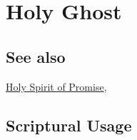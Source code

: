 \section{Holy Ghost}
	\label{HOLYGHOST}
	
\subsection{See also}
	
	\hyperref[HSOP]{Holy Spirit of Promise},





\subsection{Scriptural Usage} %
	\label{HOLYGHOST-SCRIPTURES}

	
	
